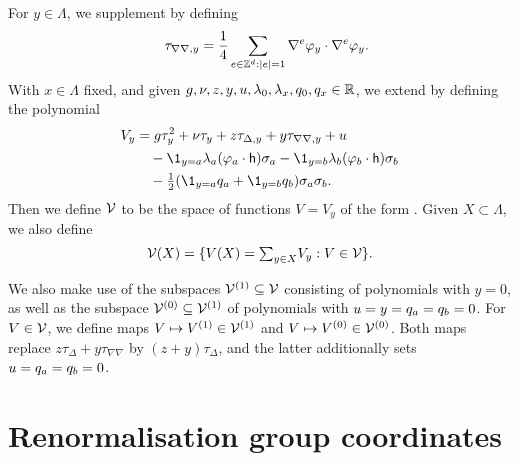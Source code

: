 For $y \in \Lambda$, we supplement  by defining
\begin{equation}
\label{e:tauphi2}
\quad \tau_{\nabla\nabla,y}
= \frac{1}{4} \sum_{e\in{\mathbb Z}^d:|e| = 1} \nabla^e \varphi_y \cdot \nabla^e \varphi_y.
\end{equation}
With $x \in \Lambda$ fixed, and
given $g,\nu,z,y,u,\lambda_0,\lambda_x,q_0,q_x \in {\mathbb R}$, we extend
by defining the polynomial
\begin{align}
    V_y &= g \tau_y^2 + \nu \tau_y + z \tau_{\Delta,y} + y \tau_{\nabla\nabla,y} + u
    \nnb
    & \quad
    - \1_{y=\pp}\lambda_{\pp}(\varphi_{\pp} \cdot {\sf h})\sigma_\pp
    - \1_{y=\qq}\lambda_{\qq}(\varphi_{\qq} \cdot {\sf h})\sigma_\qq
     \nnb
    & \quad
    - \textstyle{\frac 12} (\1_{y=\pp} q_\pp + \1_{y=\qq}q_\qq )\sigma_\pp\sigma_\qq .
\lbeq{Vy}
\end{align}
Then we define $\mathcal{V}$ to be the space of functions $V=V_y$ of the form .
Given $X \subset \Lambda$, we also define
\begin{equation}
\label{e:Vcalesig}
    \mathcal{V}(X) = \{V(X) = \textstyle{\sum_{y\in X}} V_y : V \in \mathcal{V} \}.
\end{equation}

We also make use of the subspaces $\mathcal{V}^{(1)} \subseteq \mathcal{V}$ consisting of polynomials with $y = 0$, as well as the subspace
$\mathcal{V}^{(0)} \subseteq \mathcal{V}^{(1)}$ of polynomials with
$u = y =   q_a=q_b = 0$.
For $V \in \mathcal{V}$, we define maps $V \mapsto V^{(1)} \in \mathcal{V}^{(1)}$
and $V \mapsto V^{(0)} \in \mathcal{V}^{(0)}$. Both maps replace
$z\tau_{\Delta}+y\tau_{\nabla\nabla}$ by
$(z+y)\tau_{\Delta}$, and the latter
additionally sets
$u = q_a = q_b = 0$.


\section{Renormalisation group coordinates}
\label{sec:rgcoord}


